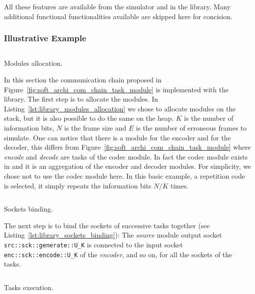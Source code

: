 All these features are available from the simulator and in the library. Many
additional functional functionalities available are skipped here for concision.

\subsubsection{Illustrative Example}

\begin{listing}[htp]
  \inputminted[frame=lines,linenos]{C++}{main/chapter4/src/library/modules_allocation.cpp}
  \caption{Modules allocation.}
  \label{lst:library_modules_allocation}
\end{listing}

In this section the communication chain proposed in
Figure~\ref{fig:soft_archi_com_chain_task_module} is implemented with the
\AFFECT library. The first step is to allocate the modules. In
Listing~\ref{lst:library_modules_allocation} we chose to allocate modules on
the stack, but it is also possible to do the same on the heap. $K$ is the number
of information bits, $N$ is the frame size and $E$ is the number of erroneous
frames to simulate. One can notice that there is a module for the encoder and
for the decoder, this differs from
Figure~\ref{fig:soft_archi_com_chain_task_module} where \textit{encode} and
\textit{decode} are tasks of the codec module. In fact the codec module exists
in \AFFECT and it is an aggregation of the encoder and decoder modules. For
simplicity, we chose not to use the codec module here. In this basic example, a
repetition code is selected, it simply repeats the information bits $N/K$ times.

\begin{listing}[htp]
  \inputminted[frame=lines,linenos]{C++}{main/chapter4/src/library/sockets_binding.cpp}
  \caption{Sockets binding.}
  \label{lst:library_sockets_binding}
\end{listing}

The next step is to bind the sockets of successive tasks together (see
Listing~\ref{lst:library_sockets_binding}): The \textit{source} module
output socket \verb|src::sck::generate::U_K| is connected to the
input socket \verb|enc::sck::encode::U_K| of the \textit{encoder}, and so
on, for all the sockets of the tasks.

\begin{listing}[htp]
  \inputminted[frame=lines,linenos]{C++}{main/chapter4/src/library/tasks_execution.cpp}
  \caption{Tasks execution.}
  \label{lst:library_tasks_execution}
\end{listing}

